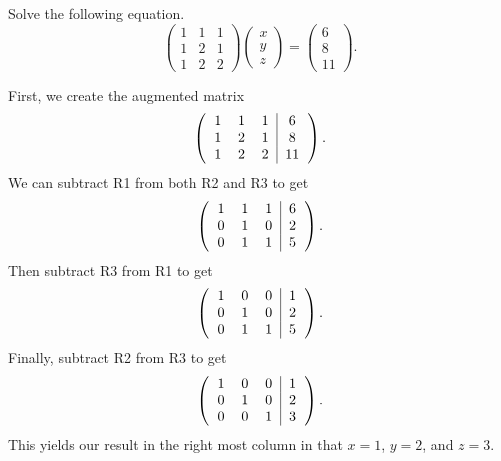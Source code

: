 \documentclass[12pt]{article} %
\begin{document}
\newpage
\begin{problem}
Solve the following equation.
\[
\begin{pmatrix} 1 & 1 & 1 \\ 1 & 2 & 1 \\ 1 & 2 & 2 \end{pmatrix} \begin{pmatrix} x \\ y \\ z \end{pmatrix} = \begin{pmatrix} 6 \\ 8 \\ 11 \end{pmatrix}.
\]
\end{problem}
\begin{solution}
First, we create the augmented matrix
\[
\left(\begin{tabular}{ccc|c} 1 & 1 & 1 & 6 \\ 1 & 2 & 1 & 8 \\ 1 & 2 & 2 & 11 \end{tabular} \right).
\]
We can subtract R1 from both R2 and R3 to get
\[
\left(\begin{tabular}{ccc|c} 1 & 1 & 1 & 6 \\ 0 & 1 & 0 & 2 \\ 0 & 1 & 1 & 5 \end{tabular} \right).
\]
Then subtract R3 from R1 to get
\[
\left(\begin{tabular}{ccc|c} 1 & 0 & 0 & 1 \\ 0 & 1 & 0 & 2 \\ 0 & 1 & 1 & 5 \end{tabular} \right).
\]
Finally, subtract R2 from R3 to get
\[
\left(\begin{tabular}{ccc|c} 1 & 0 & 0 & 1 \\ 0 & 1 & 0 & 2 \\ 0 & 0 & 1 & 3 \end{tabular} \right).
\]
This yields our result in the right most column in that $x=1$, $y=2$, and $z=3$.
\end{solution}
\end{document}
